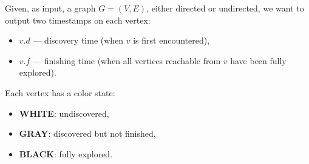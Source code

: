\documentclass[a4paper,landscape]{article}
\begin{document}
\begin{multicols}{7}
\tcolorbox[mybox={Depth-First Search}]
Given, as input, a graph $G = (V, E)$, either directed or undirected, we want to
output two timestamps on each vertex:
\begin{itemize}[noitemsep, topsep=0pt]
    \item $v.d$ — discovery time (when $v$ is first encountered),
    \item $v.f$ — finishing time (when all vertices reachable from $v$ have been fully explored).
\end{itemize}

Each vertex has a color state:
\begin{itemize}[noitemsep, topsep=0pt]
    \item \textbf{WHITE}: undiscovered,
    \item \textbf{GRAY}: discovered but not finished,
    \item \textbf{BLACK}: fully explored.
\end{itemize}

\noindent %
\end{multicols}
\end{document}
